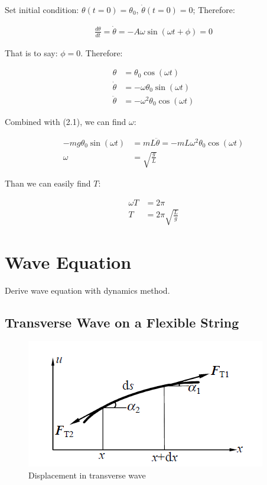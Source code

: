 \documentclass[11pt, a4paper, oneside]{book}
\numberwithin{equation}{section}%
\begin{document}
Set initial condition: $ \theta(t=0)=\theta_0 $, $ \dot{\theta}(t=0)=0 $; Therefore:

\begin{align}
\frac{d\theta}{dt} = \dot{\theta} = -A\omega \sin(\omega t + \phi)=0
\end{align}

That is to say: $ \phi = 0 $. Therefore:

\begin{align}
\theta &= \theta_0 \cos(\omega t)\\
\dot{\theta} &= -\omega \theta_0 \sin(\omega t)\\
\ddot{\theta} &= -\omega^2 \theta_0 \cos(\omega t)
\end{align}

Combined with (2.1), we can find $\omega$:

\begin{align}
-mg \theta_0 \sin(\omega t) &= mL \ddot{\theta} = - mL\omega^2 \theta_0 \cos(\omega t)\\
\omega &= \sqrt{\frac{g}{L}}
\end{align}

Than we can easily find $ T $:

\begin{align}
\omega T &= 2\pi\\
T &= 2\pi\sqrt{\frac{L}{g}}
\end{align}

\section{Wave Equation}

Derive wave equation with dynamics method.

\subsection{Transverse Wave on a Flexible String}
\begin{figure}[H]
	\centering
	\includegraphics[width=0.5\linewidth]{"Displacement in transversive wave"}
	\caption{Displacement in transverse wave}
	\label{fig:displacement-in-transverse-wave}
\end{figure}
\end{document}
